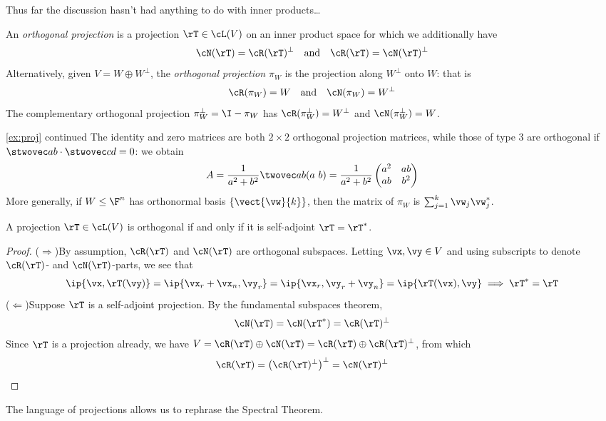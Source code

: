 Thus far the discussion hasn't had anything to do with inner products\ldots

\begin{defn}{}{}
An \emph{orthogonal projection} is a projection $\rT\in\cL(V)$ on an inner product space for which we additionally have
\[\cN(\rT)=\cR(\rT)^\perp\quad\text{and}\quad \cR(\rT)=\cN(\rT)^\perp\]
Alternatively, given $V=W\oplus W^\perp$, the \emph{orthogonal projection $\pi_W$} is the projection along $W^\perp$ onto $W$: that is
\[\cR(\pi_W)=W\quad\text{and}\quad \cN(\pi_W)=W^\perp\]
The complementary orthogonal projection $\pi_W^\perp=\I-\pi_W$ has $\cR(\pi_W^\perp)=W^\perp$ and $\cN(\pi_W^\perp)=W$.
\end{defn}

\begin{example*}{\ref{ex:proj} continued}{}
The identity and zero matrices are both $2\times 2$ orthogonal projection matrices, while those of type 3 are orthogonal if $\stwovec ab\cdot\stwovec cd=0$: we obtain
\[A=\frac 1{a^2+b^2}\twovec ab(a\ b)=\frac 1{a^2+b^2}\begin{pmatrix}
a^2&ab\\ab&b^2
\end{pmatrix}\]
More generally, if $W\le\F^n$ has orthonormal basis $\{\vect{\vw}{k}\}$, then the matrix of $\pi_W$ is $\sum_{j=1}^k\vw_j\vw_j^*$.
\end{example*}

\goodbreak

\begin{thm}{}{}
A projection $\rT\in\cL(V)$ is orthogonal if and only if it is self-adjoint $\rT=\rT^*$. 
\end{thm}
  
\begin{proof}
($\Rightarrow$)\quad By assumption, $\cR(\rT)$ and $\cN(\rT)$ are orthogonal subspaces. Letting $\vx,\vy\in V$ and using subscripts to denote $\cR(\rT)$- and $\cN(\rT)$-parts, we see that
\[\ip{\vx,\rT(\vy)}=\ip{\vx_r+\vx_n,\vy_r}=\ip{\vx_r,\vy_r+\vy_n}=\ip{\rT(\vx),\vy} \implies \rT^*=\rT\]
($\Leftarrow$)\quad Suppose $\rT$ is a self-adjoint projection. By the fundamental subspaces theorem,
\[\cN(\rT)=\cN(\rT^*)=\cR(\rT)^\perp\]
Since $\rT$ is a projection already, we have $V=\cR(\rT)\oplus\cN(\rT)= \cR(\rT)\oplus \cR(\rT)^\perp$, from which 
\[\cR(\rT)=\bigl(\cR(\rT)^\perp\bigr)^\perp=\cN(\rT)^\perp\tag*{\qedhere}\]
\end{proof}
 

The language of projections allows us to rephrase the Spectral Theorem.
  
